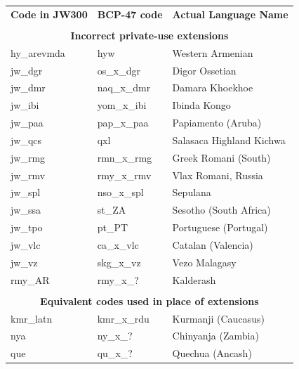 \begin{table}[th]
    \centering
    \begin{tabular}{lll}
        \toprule
        \textbf{Code in JW300} & \textbf{BCP-47 code} & \textbf{Actual Language Name} \\
        \multicolumn{3}{c}{}                                                          \\
        \multicolumn{3}{c}{\textbf{Incorrect private-use extensions}}                 \\
        \hdashline
        hy\_arevmda            & hyw                  & Western Armenian              \\
        jw\_dgr                & os\_x\_dgr           & Digor Ossetian                \\
        jw\_dmr                & naq\_x\_dmr          & Damara Khoekhoe               \\
        jw\_ibi                & yom\_x\_ibi          & Ibinda Kongo                  \\
        jw\_paa                & pap\_x\_paa          & Papiamento (Aruba)            \\
        jw\_qcs                & qxl                  & Salasaca Highland Kichwa      \\
        jw\_rmg                & rmn\_x\_rmg          & Greek Romani (South)          \\
        jw\_rmv                & rmy\_x\_rmv          & Vlax Romani, Russia           \\
        jw\_spl                & nso\_x\_spl          & Sepulana                      \\
        jw\_ssa                & st\_ZA               & Sesotho (South Africa)        \\
        jw\_tpo                & pt\_PT               & Portuguese (Portugal)         \\
        jw\_vlc                & ca\_x\_vlc           & Catalan (Valencia)            \\
        jw\_vz                 & skg\_x\_vz           & Vezo Malagasy                 \\
        rmy\_AR                & rmy\_x\_?            & Kalderash                     \\

        \multicolumn{3}{c}{}                                                          \\
        \multicolumn{3}{c}{\textbf{Equivalent codes used in place of extensions}}     \\
        \hdashline
        kmr\_latn              & kmr\_x\_rdu          & Kurmanji (Caucasus)           \\
        nya                    & ny\_x\_?             & Chinyanja (Zambia)            \\
        que                    & qu\_x\_?             & Quechua (Ancash)              \\


\end{tabular}
\end{table}
